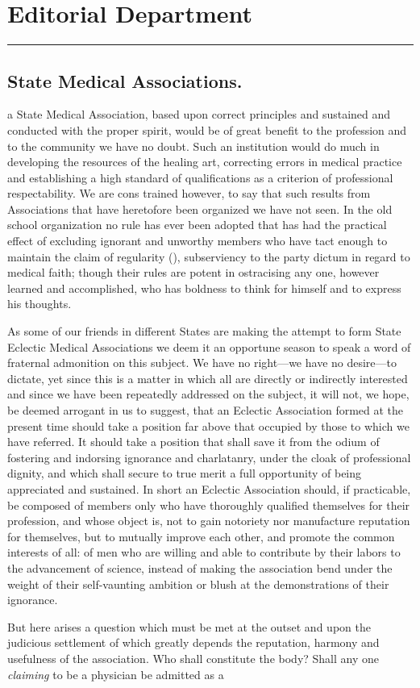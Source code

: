 \chapter*{Editorial Department}

\fancybreak{*}

\section*{State Medical Associations.}

 a State Medical Association, based upon correct principles and
sustained and conducted with the proper spirit, would be of great benefit
to the profession and to the community we have no doubt. Such an
institution would do much in developing the resources of the healing
art, correcting errors in medical practice and establishing a high standard
of qualifications as a criterion of professional respectability. We
are cons trained however, to say that such results from Associations that
have heretofore been organized we have not seen. In the old school
organization no rule has ever been adopted that has had the practical
effect of excluding ignorant and unworthy members who have tact
enough to maintain the claim of regularity (), subserviency to the
party dictum in regard to medical faith; though their rules are potent
in ostracising any one, however learned and accomplished, who has boldness
to think for himself and to express his thoughts.

As some of our friends in different States are making the attempt to
form State Eclectic Medical Associations we deem it an opportune
season to speak a word of fraternal admonition on this subject. We
have no right---we have no desire---to dictate, yet since this is a matter
in which all are directly or indirectly interested and since we have been
repeatedly addressed on the subject, it will not, we hope, be deemed
arrogant in us to suggest, that an Eclectic Association formed at the
present time should take a position far above that occupied by those
to which we have referred. It should take a position that shall save
it from the odium of fostering and indorsing ignorance and charlatanry,
under the cloak of professional dignity, and which shall secure to true
merit a full opportunity of being appreciated and sustained. In short
an Eclectic Association should, if practicable, be composed of members
only who have thoroughly qualified themselves for their profession, and
whose object is, not to gain notoriety nor manufacture reputation for
themselves, but to mutually improve each other, and promote the common
interests of all: of men who are willing and able to contribute by
their labors to the advancement of science, instead of making the
association bend under the weight of their self-vaunting ambition or
blush at the demonstrations of their ignorance.

But here arises a question which must be met at the outset and
upon the judicious settlement of which greatly depends the reputation,
harmony and usefulness of the association. Who shall constitute the
body?  Shall any one \emph{claiming} to be a physician be admitted as a\endinput
